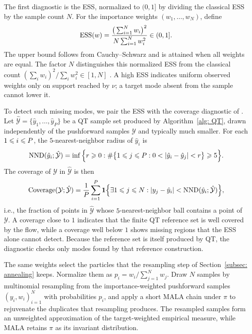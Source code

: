 \documentclass{article}
\begin{document}
The first diagnostic is the ESS, normalized to $(0,1]$ by dividing the classical ESS by the sample count $N$. For the importance weights $(w_1,\dots,w_N)$, define
\begin{equation}
    \mathrm{ESS}(w) = \frac{\big(\sum_{i=1}^{N} w_i\big)^2}{N \sum_{i=1}^{N} w_i^2} \in (0,1].
    \label{eq: ESS}
\end{equation}
The upper bound follows from Cauchy--Schwarz and is attained when all weights are equal. The factor $N$ distinguishes this normalized ESS from the classical count $(\sum_iw_i)^2/\sum_iw_i^2\in[1,N]$ \citep{martino2017rethinking}. A high ESS indicates uniform observed weights only on support reached by $\nu$; a target mode absent from the sample cannot lower it.

To detect such missing modes, we pair the ESS with the coverage diagnostic of \citet{naeem2020reliable}. Let $\hat{\mathcal Y} = \{\hat y_1,\dots,\hat y_P\}$ be a QT sample set produced by Algorithm~\ref{alg: QT}, drawn independently of the pushforward samples $\mathcal Y$ and typically much smaller. For each $1 \leqslant i \leqslant P$, the $5$-nearest-neighbor radius of $\hat y_i$ is
\begin{equation}
    \mathrm{NND}(\hat y_i;{\hat{\mathcal Y}}) = \inf\Big\{ r \geqslant 0 :
    \# \big\{1\leqslant j \leqslant P: 0 < |\hat y_i - \hat y_j| < r\big\} \geqslant 5
    \Big\}.
\end{equation}
The coverage of $\mathcal Y$ in $\hat{\mathcal Y}$ is then
\begin{equation}
    \mathrm{Coverage}({\mathcal Y;\hat{\mathcal Y}}) =
    \frac{1}{P} \sum_{i=1}^{P} \mathbf 1\Bigl\{
        \exists  1\leqslant j\leqslant N : |y_j - \hat y_i| < \mathrm{NND}(\hat y_i;\hat{\mathcal Y})
    \Bigr\},
\end{equation}
i.e., the fraction of points in $\hat{\mathcal Y}$ whose $5$-nearest-neighbor ball contains a point of $\mathcal Y$. A coverage close to $1$ indicates that the finite QT reference set is well covered by the flow, while a coverage well below $1$ shows missing regions that the ESS alone cannot detect. Because the reference set is itself produced by QT, the diagnostic checks only modes found by that reference construction.

The same weights select the particles that the resampling step of Section~\ref{subsec: annealing} keeps. Normalize them as $p_i=w_i/\sum_{j=1}^{N}w_j$. Draw $N$ samples by multinomial resampling from the importance-weighted pushforward samples $(y_i,w_i)_{i=1}^{N}$ with probabilities $p_i$, and apply a short MALA chain under $\pi$ to rejuvenate the duplicates that resampling produces. The resampled samples form an unweighted approximation of the target-weighted empirical measure, while MALA retains $\pi$ as its invariant distribution.
\end{document}
